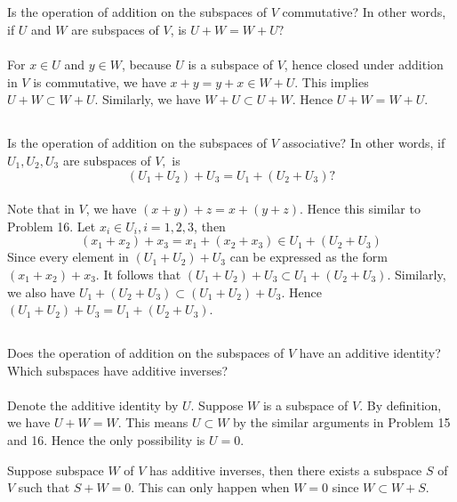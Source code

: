 \documentclass[a4paper]{article}
\begin{document}
\subsection{}
Is the operation of addition on the subspaces of $V$ commutative? In other words, if $U$ and $W$ are subspaces of $V$, is $U+W=W+U ?$
\paragraph{}
For $x\in U$ and $y\in W$, because $U$ is a subspace of $V$, hence closed under addition in $V$ is commutative, we have $x+y=y+x\in W+U$.
This implies $U+W\subset W+U$. Similarly, we have $W+U \subset U+W$. Hence $U+W=W+U$.

\subsection{}
Is the operation of addition on the subspaces of $V$ associative? In other words, if $U_{1}, U_{2}, U_{3}$ are subspaces of $V,$ is
\[
    \left(U_{1}+U_{2}\right)+U_{3}=U_{1}+\left(U_{2}+U_{3}\right) ?
\]
\paragraph{}
Note that in $V$, we have $(x+y)+z=x+(y+z)$. Hence this similar to Problem 16. Let $x_i\in U_i, i=1,2,3$, then
\[
    (x_1+x_2)+x_3=x_1+(x_2+x_3)\in U_1 +(U_2+U_3)
\]
Since every element in $(U_1+U_2)+U_3$ can be expressed as the form $(x_1+x_2)+x_3$. It follows that $(U_1+U_2)+U_3\subset U_1+(U_2+U_3)$.
Similarly, we also have $U_1+(U_2+U_3)\subset (U_1+U_2)+U_3$. Hence $(U_1+U_2) + U_3=U_1+(U_2+U_3)$.

\subsection{}
Does the operation of addition on the subspaces of $V$ have an additive identity? Which subspaces have additive inverses?
\paragraph{}
Denote the additive identity by $U$. Suppose $W$ is a subspace of $V$. By definition, we have $U + W = W$. This means $U\subset W$ by the similar arguments in
Problem 15 and 16. Hence the only possibility is $U = 0$.

Suppose subspace $W$ of $V$ has additive inverses, then there exists a subspace $S$ of $V$ such that $S+W=0$. This can only happen when $W=0$
since $W\subset W+S$.
\end{document}
